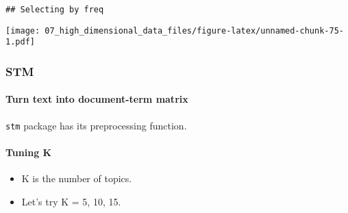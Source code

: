 \documentclass[
]{book}
\newenvironment{Shaded}{\begin{snugshade}}{\end{snugshade}}
\newcommand{\AttributeTok}[1]{\textcolor[rgb]{0.77,0.63,0.00}{#1}}
\newcommand{\ConstantTok}[1]{\textcolor[rgb]{0.00,0.00,0.00}{#1}}
\newcommand{\DecValTok}[1]{\textcolor[rgb]{0.00,0.00,0.81}{#1}}
\newcommand{\FunctionTok}[1]{\textcolor[rgb]{0.00,0.00,0.00}{#1}}
\newcommand{\NormalTok}[1]{#1}
\newcommand{\OtherTok}[1]{\textcolor[rgb]{0.56,0.35,0.01}{#1}}
\newcommand{\SpecialCharTok}[1]{\textcolor[rgb]{0.00,0.00,0.00}{#1}}
\providecommand{\tightlist}{%
  \setlength{\itemsep}{0pt}\setlength{\parskip}{0pt}}
\begin{document}
\begin{verbatim}
## Selecting by freq
\end{verbatim}

\texttt{[image: 07\_high\_dimensional\_data\_files/figure-latex/unnamed-chunk-75-1.pdf]}

\hypertarget{stm}{%
\subsubsection{STM}\label{stm}}

\hypertarget{turn-text-into-document-term-matrix}{%
\paragraph{Turn text into document-term matrix}\label{turn-text-into-document-term-matrix}}

\texttt{stm} package has its preprocessing function.

\begin{Shaded}
\end{Shaded}

\hypertarget{tuning-k}{%
\paragraph{Tuning K}\label{tuning-k}}

\begin{itemize}
\tightlist
\item
  K is the number of topics.
\item
  Let's try K = 5, 10, 15.
\end{itemize}

\begin{Shaded}
\end{Shaded}
\end{document}
